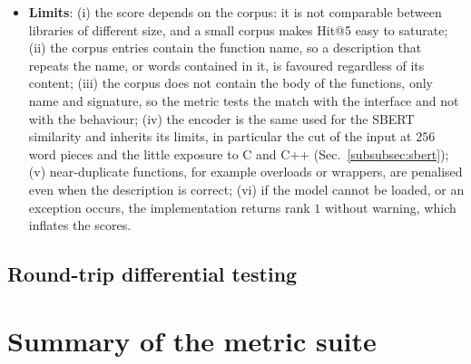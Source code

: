 \begin{itemize}[leftmargin=*, label=\textbullet]
	\item \textbf{Limits}: (i) the score depends on the corpus: it is not comparable between
	libraries of different size, and a small corpus makes Hit@5 easy to saturate; (ii) the corpus
	entries contain the function name, so a description that repeats the name, or words contained in
	it, is favoured regardless of its content; (iii) the corpus does not contain the body of the
	functions, only name and signature, so the metric tests the match with the interface and not
	with the behaviour; (iv) the encoder is the same used for the SBERT similarity and inherits its
	limits, in particular the cut of the input at $256$ word pieces and the little exposure to C
	and C++ (Sec.~\ref{subsubsec:sbert}); (v) near-duplicate functions, for example overloads or
	wrappers, are penalised even when the description is correct; (vi) if the model cannot be
	loaded, or an exception occurs, the implementation returns rank $1$ without warning, which
	inflates the scores.
\end{itemize}

\subsection{Round-trip differential testing}
\label{sec:m-roundtrip}

\section{Summary of the metric suite}
\label{sec:metrics-summary}


